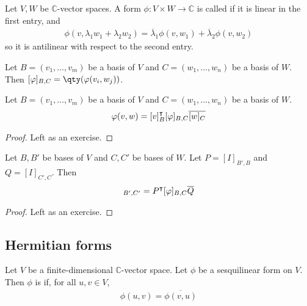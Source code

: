 \begin{definition}
	Let $V, W$ be $\mathbb C$-vector spaces.
	A form $\phi \colon V \times W \to \mathbb C$ is called  if it is linear in the first entry, and
	\begin{align*}
		\phi(v, \lambda_1 w_1 + \lambda_2 w_2) = \overline \lambda_1 \phi(v,w_1) + \overline \lambda_2 \phi(v,w_2)
	\end{align*}
	so it is antilinear with respect to the second entry.
\end{definition}

\begin{definition}
	Let $B = (v_1, \dots, v_m)$ be a basis of $V$ and $C = (w_1, \dots, w_n)$ be a basis of $W$.
	Then $[\phi]_{B,C} = \qty(\phi(v_i, w_j))$.
\end{definition} 

\begin{lemma}
	Let $B = (v_1, \dots, v_m)$ be a basis of $V$ and $C = (w_1, \dots, w_n)$ be a basis of $W$.
	\begin{align*}
		\varphi(v,w) = [v]_B^\intercal [\varphi]_{B,C} \overline{[w]_C}
	\end{align*}
\end{lemma}

\begin{proof}
	Left as an exercise.
\end{proof}

\begin{lemma}
	Let $B, B'$ be bases of $V$ and $C, C'$ be bases of $W$.
	Let $P = [I]_{B', B}$ and $Q = [I]_{C', C}$.
	Then
	\begin{align*}
		[\phi]_{B', C'} = P^\transpose [\phi]_{B,C} \overline Q
	\end{align*}
\end{lemma} 

\begin{proof}
	Left as an exercise.
\end{proof}

\subsection{Hermitian forms}
\begin{definition}
	Let $V$ be a finite-dimensional $\mathbb C$-vector space.
	Let $\phi$ be a sesquilinear form on $V$.
	Then $\phi$ is  if, for all $u, v \in V$,
	\begin{align*}
		\phi(u, v) = \overline{\phi(v,u)}
	\end{align*}
\end{definition}

